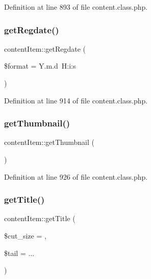 Definition at line 893 of file content.\+class.\+php.

\mbox{\label{classcontentItem_aae303f7b7e5c67302f42f9d9c67b89c2}} 
\subsubsection{\texorpdfstring{get\+Regdate()}{getRegdate()}}
{\footnotesize\ttfamily content\+Item\+::get\+Regdate (\begin{DoxyParamCaption}\item[{}]{\$format = {\ttfamily \textquotesingle{}Y.m.d~H\+:i\+:s\textquotesingle{}} }\end{DoxyParamCaption})}



Definition at line 914 of file content.\+class.\+php.

\mbox{\label{classcontentItem_a2d0ac2755de034bee02842e1b4b8179c}} 
\subsubsection{\texorpdfstring{get\+Thumbnail()}{getThumbnail()}}
{\footnotesize\ttfamily content\+Item\+::get\+Thumbnail (\begin{DoxyParamCaption}{ }\end{DoxyParamCaption})}



Definition at line 926 of file content.\+class.\+php.

\mbox{\label{classcontentItem_aa061be1a76a2d94912440572bd4f875a}} 
\subsubsection{\texorpdfstring{get\+Title()}{getTitle()}}
{\footnotesize\ttfamily content\+Item\+::get\+Title (\begin{DoxyParamCaption}\item[{}]{\$cut\+\_\+size = {},  }\item[{}]{\$tail = {\ttfamily \textquotesingle{}...\textquotesingle{}} }\end{DoxyParamCaption})}



